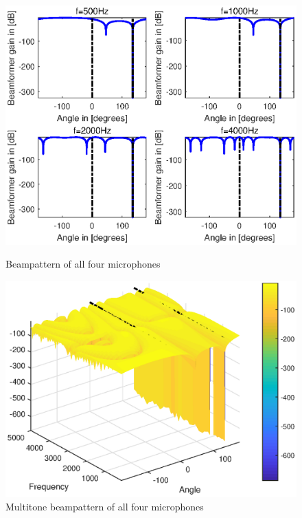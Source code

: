 \documentclass[onecolumn, conference]{IEEEtran}
\begin{document}
\begin{figure}[htbp]
	\begin{minipage}[b]{0.5\linewidth}
		\centerline{\includegraphics[width=1\textwidth]{img/1_a_3.eps}}
		\caption{Beampattern of all four microphones}
		\label{Beampattern of all four microphones135}
	\end{minipage}
	\hfill
	\begin{minipage}[b]{0.5\linewidth}
		\centerline{\includegraphics[width=1\textwidth]{img/1_a_3_multi_135.eps}}
		\caption{Multitone beampattern of all four microphones}
		\label{Multitone beampattern of all four microphones135}
	\end{minipage}
\end{figure}
\end{document}
